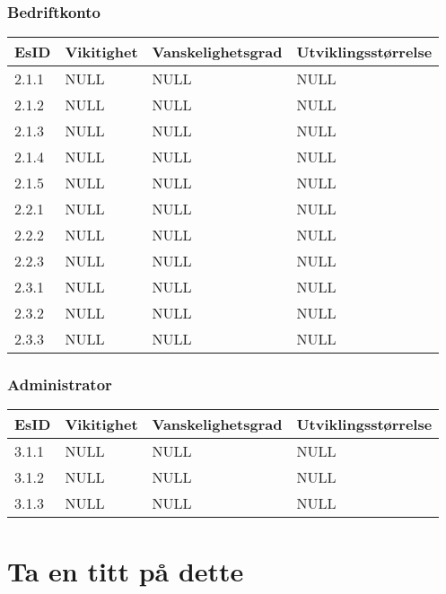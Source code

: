 \documentclass[12pt]{article}
\begin{document}
        \subsubsection{Bedriftkonto}
        \begin{tabular}{|p{2cm}|p{4cm}|p{4cm}|p{4cm}| } 
            \hline
            \bf EsID & \bf Vikitighet & \bf Vanskelighetsgrad & \bf Utviklingsstørrelse\\
            \hline
            2.1.1 & NULL & NULL & NULL\\
            \hline
            2.1.2 & NULL & NULL & NULL\\
            \hline
            2.1.3 & NULL & NULL & NULL\\
            \hline
            2.1.4 & NULL & NULL & NULL\\
            \hline
            2.1.5 & NULL & NULL & NULL\\
            \hline
            2.2.1 & NULL & NULL & NULL\\
            \hline
            2.2.2 & NULL & NULL & NULL\\
            \hline
            2.2.3 & NULL & NULL & NULL\\
            \hline
            2.3.1 & NULL & NULL & NULL\\
            \hline
            2.3.2 & NULL & NULL & NULL\\
            \hline
            2.3.3 & NULL & NULL & NULL\\
            \hline
        \end{tabular}

        \subsubsection{Administrator}
        \begin{tabular}{|p{2cm}|p{4cm}|p{4cm}|p{4cm}| } 
            \hline
            \bf EsID & \bf Vikitighet & \bf Vanskelighetsgrad & \bf Utviklingsstørrelse\\
            \hline
            3.1.1 & NULL & NULL & NULL\\
            \hline
            3.1.2 & NULL & NULL & NULL\\
            \hline
            3.1.3 & NULL & NULL & NULL\\
            \hline
        \end{tabular}
\section{Ta en titt på dette}
\end{document}

